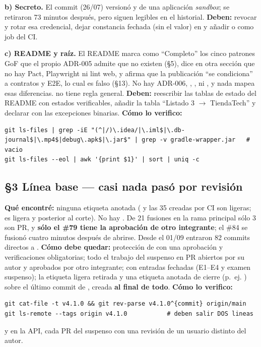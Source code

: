 \textbf{b) Secreto.} El commit  (26/07) version\'o  y  de una aplicaci\'on \emph{sandbox}; se retiraron 73 minutos despu\'es, pero siguen legibles en el historial. \textbf{Deben:} revocar y rotar esa credencial, dejar constancia fechada (sin el valor) en  y a\~nadir  o  como job del CI.

\textbf{c) README y ra\'iz.} El README marca como ``Completo'' los cinco patrones GoF que el propio ADR-005 admite que no existen (\S5), dice en otra secci\'on que no hay Pact, Playwright ni lint web, y afirma que la publicaci\'on ``se condiciona'' a contratos y E2E, lo cual es falso (\S13). No hay ADR-006, , ,  ni , y nada mapea esas diferencias.  no tiene regla general. \textbf{Deben:} reescribir las tablas de estado del README con estados verificables, a\~nadir la tabla ``Listado 3 $\rightarrow$ TiendaTech'' y declarar  con las excepciones binarias. \textbf{C\'omo lo verifico:}\begin{verbatim}
git ls-files | grep -iE "(^|/)\.idea/|\.iml$|\.db-journal$|\.mp4$|debug\.apk$|\.jar$" | grep -v gradle-wrapper.jar   # vacio
git ls-files --eol | awk '{print $1}' | sort | uniq -c
\end{verbatim}

\subsection*{\S3 L\'inea base --- casi nada pas\'o por revisi\'on}
\textbf{Qu\'e encontr\'e:} ninguna etiqueta anotada ( y las 35  creadas por CI son ligeras;  es ligera y posterior al corte). No hay . De 21 fusiones en la rama principal s\'olo 3 son PR, y \textbf{s\'olo el \#79 tiene la aprobaci\'on de otro integrante}; el \#84 se fusion\'o cuatro minutos despu\'es de abrirse. Desde el 01/09 entraron 82 commits directos a . \textbf{C\'omo debe quedar:} protecci\'on de  con una aprobaci\'on y verificaciones obligatorias; todo el trabajo del suspenso en PR abiertos por su autor y aprobados por otro integrante;  con entradas fechadas (E1--E4 y examen suspenso); la etiqueta ligera  retirada y una etiqueta anotada de cierre (p.~ej. ) sobre el \'ultimo commit de , creada \textbf{al final de todo}. \textbf{C\'omo lo verifico:}\begin{verbatim}
git cat-file -t v4.1.0 && git rev-parse v4.1.0^{commit} origin/main
git ls-remote --tags origin v4.1.0           # deben salir DOS lineas
\end{verbatim}
y en la API, cada PR del suspenso con una revisi\'on  de un usuario distinto del autor.


